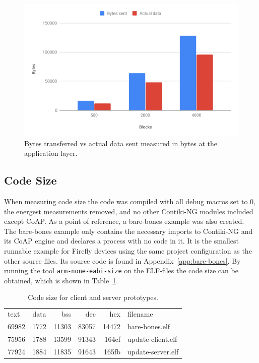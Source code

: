 \documentclass[0-thesis.tex]{subfiles}
\begin{document}
\begin{figure}[h!]
    \caption{Bytes transferred vs actual data sent measured in bytes at the application layer.}
    \label{fig:communication-overhead}
    \includegraphics[scale=0.65]{images/communication-overhead.pdf}
\end{figure}

\subsection{Code Size}
\label{ssec:code-size}
When measuring code size the code was compiled with all debug macros set to 0, the
energest measurements removed, and no other Contiki-NG modules included except CoAP. As a
point of reference, a bare-bones example was also created. The bare-bones example only
contains the necessary imports to Contiki-NG and its CoAP engine and declares a process
with no code in it. It is the smallest runnable example for Firefly devices using the same
project configuration as the other source files. Its source code is found in
Appendix~\ref{app:bare-bones}. By running the tool \texttt{arm-none-eabi-size} on the
ELF-files the code size can be obtained, which is shown in Table~\ref{tab:code-size}.

\begin{table}[h!]
\begin{tabular}{l c r r r l}
text	&  data	 &  bss	 &  dec	 &  hex&filename\\
69982	&  1772	 &11303	 &83057	 &14472&bare-bones.elf\\
75956	&  1788	 &13599	 &91343	 &164cf&update-client.elf\\
77924	&  1884	 &11835	 &91643	 &165fb&update-server.elf
\end{tabular}
\caption{Code size for client and server prototypes.}
\label{tab:code-size}
\end{table}
\end{document}

